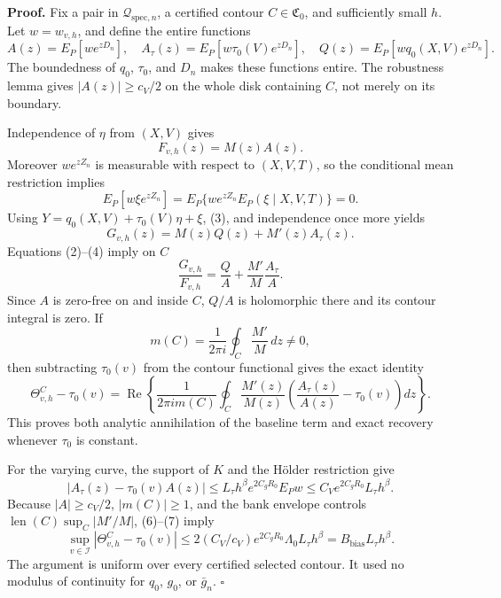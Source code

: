 \textbf{Proof.}
Fix a pair in \(\mathcal Q_{\mathrm{spec},n}\), a certified contour \(C\in\mathfrak C_0\), and sufficiently small \(h\).  Let \(w=w_{v,h}\), and define the entire functions
\[
 A(z)=E_P[we^{zD_n}],\quad
 A_\tau(z)=E_P[w\tau_0(V)e^{zD_n}],\quad
 Q(z)=E_P[wq_0(X,V)e^{zD_n}]. \tag{1}
\]
The boundedness of \(q_0\), \(\tau_0\), and \(D_n\) makes these functions entire.  The robustness lemma gives \(|A(z)|\ge c_V/2\) on the whole disk containing \(C\), not merely on its boundary.

Independence of \(\eta\) from \((X,V)\) gives
\[
 F_{v,h}(z)=M(z)A(z). \tag{2}
\]
Moreover \(w e^{zZ_n}\) is measurable with respect to \((X,V,T)\), so the conditional mean restriction implies
\[
 E_P[w\xi e^{zZ_n}]
 =E_P\{we^{zZ_n}E_P(\xi\mid X,V,T)\}=0. \tag{3}
\]
Using \(Y=q_0(X,V)+\tau_0(V)\eta+\xi\), (3), and independence once more yields
\[
 G_{v,h}(z)=M(z)Q(z)+M'(z)A_\tau(z). \tag{4}
\]
Equations (2)--(4) imply on \(C\)
\[
 \frac{G_{v,h}}{F_{v,h}}
 =\frac{Q}{A}+\frac{M'}{M}\frac{A_\tau}{A}. \tag{5}
\]
Since \(A\) is zero-free on and inside \(C\), \(Q/A\) is holomorphic there and its contour integral is zero.  If
\[
 m(C)=\frac{1}{2\pi i}\oint_C\frac{M'}M\,dz\ne0,
\]
then subtracting \(\tau_0(v)\) from the contour functional gives the exact identity
\[
 \Theta^C_{v,h}-\tau_0(v)
 =\operatorname{Re}\left\{
 \frac{1}{2\pi i m(C)}\oint_C\frac{M'(z)}{M(z)}
 \left(\frac{A_\tau(z)}{A(z)}-\tau_0(v)\right)dz
 \right\}. \tag{6}
\]
This proves both analytic annihilation of the baseline term and exact recovery whenever \(\tau_0\) is constant.

For the varying curve, the support of \(K\) and the H\"older restriction give
\[
 |A_\tau(z)-\tau_0(v)A(z)|
 \le L_\tau h^\beta e^{2C_gR_0}E_Pw
 \le C_Ve^{2C_gR_0}L_\tau h^\beta. \tag{7}
\]
Because \(|A|\ge c_V/2\), \(|m(C)|\ge1\), and the bank envelope controls \(\operatorname{len}(C)\sup_C|M'/M|\), (6)--(7) imply
\[
 \sup_{v\in\mathcal I}|\Theta^C_{v,h}-\tau_0(v)|
 \le 2(C_V/c_V)e^{2C_gR_0}\Lambda_0L_\tau h^\beta
 =B_{\mathrm{bias}}L_\tau h^\beta.
\]
The argument is uniform over every certified selected contour.  It used no modulus of continuity for \(q_0\), \(g_0\), or \(\bar g_n\). \(\square\)